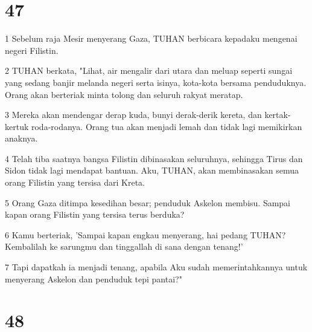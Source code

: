 \chapter{47}

\par 1 Sebelum raja Mesir menyerang Gaza, TUHAN berbicara kepadaku mengenai negeri Filistin.
\par 2 TUHAN berkata, "Lihat, air mengalir dari utara dan meluap seperti sungai yang sedang banjir melanda negeri serta isinya, kota-kota bersama penduduknya. Orang akan berteriak minta tolong dan seluruh rakyat meratap.
\par 3 Mereka akan mendengar derap kuda, bunyi derak-derik kereta, dan kertak-kertuk roda-rodanya. Orang tua akan menjadi lemah dan tidak lagi memikirkan anaknya.
\par 4 Telah tiba saatnya bangsa Filistin dibinasakan seluruhnya, sehingga Tirus dan Sidon tidak lagi mendapat bantuan. Aku, TUHAN, akan membinasakan semua orang Filistin yang tersisa dari Kreta.
\par 5 Orang Gaza ditimpa kesedihan besar; penduduk Askelon membisu. Sampai kapan orang Filistin yang tersisa terus berduka?
\par 6 Kamu berteriak, 'Sampai kapan engkau menyerang, hai pedang TUHAN? Kembalilah ke sarungmu dan tinggallah di sana dengan tenang!'
\par 7 Tapi dapatkah ia menjadi tenang, apabila Aku sudah memerintahkannya untuk menyerang Askelon dan penduduk tepi pantai?"

\chapter{48}


